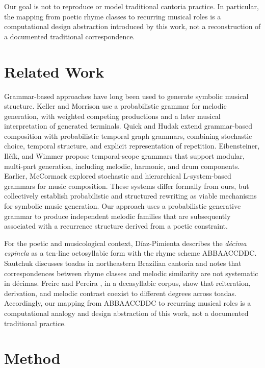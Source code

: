 \documentclass{article}
\begin{document}
Our goal is not to reproduce or model traditional cantoria practice. In particular, the mapping from poetic rhyme classes to recurring musical roles is a computational design abstraction introduced by this work, not a reconstruction of a documented traditional correspondence.

\section{Related Work}\label{sec:related_work}

Grammar-based approaches have long been used to generate symbolic musical structure. Keller and Morrison \cite{keller2007grammatical} use a probabilistic grammar for melodic generation, with weighted competing productions and a later musical interpretation of generated terminals. Quick and Hudak \cite{quick2013grammar} extend grammar-based composition with probabilistic temporal graph grammars, combining stochastic choice, temporal structure, and explicit representation of repetition. Eibensteiner, Il\v{c}\'ik, and Wimmer \cite{eibensteiner2021temporal} propose temporal-scope grammars that support modular, multi-part generation, including melodic, harmonic, and drum components. Earlier, McCormack \cite{mccormack1996grammar} explored stochastic and hierarchical L-system-based grammars for music composition. These systems differ formally from ours, but collectively establish probabilistic and structured rewriting as viable mechanisms for symbolic music generation. Our approach uses a probabilistic generative grammar to produce independent melodic families that are subsequently associated with a recurrence structure derived from a poetic constraint.

For the poetic and musicological context, D\'iaz-Pimienta \cite{diazpimienta2021improvisacion} describes the \textit{d\'ecima espinela} as a ten-line octosyllabic form with the rhyme scheme ABBAACCDDC. Sautchuk \cite{sautchuk2010poetica} discusses toadas in northeastern Brazilian cantoria and notes that correspondences between rhyme classes and melodic similarity are not systematic in d\'ecimas. Freire and Pereira \cite{freire2019tratamento}, in a decasyllabic corpus, show that reiteration, derivation, and melodic contrast coexist to different degrees across toadas. Accordingly, our mapping from ABBAACCDDC to recurring musical roles is a computational analogy and design abstraction of this work, not a documented traditional practice.

\section{Method}\label{sec:method}
\end{document}
